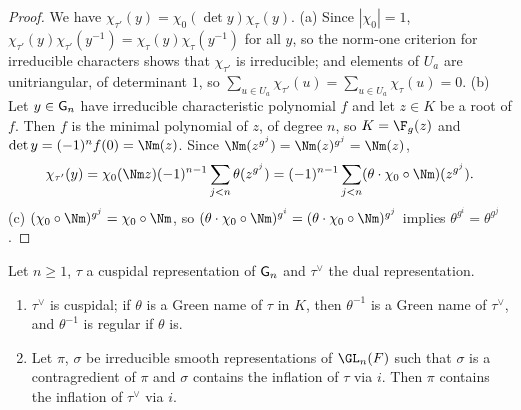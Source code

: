 \begin{proof}
We have $\chi_{\tau'}(y)=\chi_0(\det y)\chi_\tau(y)$. (a) Since $|\chi_0|=1$, $\chi_{\tau'}(y)\chi_{\tau'}(y^{-1})=
\chi_\tau(y)\chi_\tau(y^{-1})$ for all $y$, so the norm-one criterion for irreducible characters
\cite[\S2.3]{Serre1977} shows that $\chi_{\tau'}$ is irreducible; and elements of $U_a$ are unitriangular, of
determinant $1$, so $\sum_{u\in U_a}\chi_{\tau'}(u)=\sum_{u\in U_a}\chi_\tau(u)=0$. (b) Let $y\in\mathsf{G}_n$ have
irreducible characteristic polynomial $f$ and let $z\in K$ be a root of $f$. Then $f$ is the minimal polynomial of
$z$, of degree $n$, so $K=\F_g(z)$ and $\det y=(-1)^nf(0)=\Nm(z)$. Since $\Nm(z^{g^j})=\Nm(z)^{g^j}=\Nm(z)$,
\[
  \chi_{\tau'}(y)=\chi_0(\Nm z)(-1)^{n-1}\sum_{j<n}\theta(z^{g^j})=(-1)^{n-1}\sum_{j<n}(\theta\cdot\chi_0\circ\Nm)(z^{g^j}).
\]
(c) $(\chi_0\circ\Nm)^{g^j}=\chi_0\circ\Nm$, so $(\theta\cdot\chi_0\circ\Nm)^{g^i}=(\theta\cdot\chi_0\circ\Nm)^{g^j}$
implies $\theta^{g^i}=\theta^{g^j}$.
\end{proof}

\begin{lemma}\label{pf:llc:typedual}
Let $n\ge1$, $\tau$ a cuspidal representation of $\mathsf{G}_n$ and $\tau^\vee$ the dual representation.
\begin{enumerate}[label=(\alph*)]
\item $\tau^\vee$ is cuspidal; if $\theta$ is a Green name of $\tau$ in $K$, then $\theta^{-1}$ is a Green name of
  $\tau^\vee$, and $\theta^{-1}$ is regular if $\theta$ is.
\item Let $\pi$, $\sigma$ be irreducible smooth representations of $\GL_n(F)$ such that $\sigma$ is a
  contragredient of $\pi$ and $\sigma$ contains the inflation of $\tau$ via $i$. Then $\pi$ contains the
  inflation of $\tau^\vee$ via $i$.
\end{enumerate}
\end{lemma}

